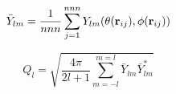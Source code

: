 \documentclass[12pt]{article}
\begin{document}
$$
   \bar{Y}_{lm} = \frac{1}{nnn}\sum_{j = 1}^{nnn} Y_{lm}( \theta( {\bf r}_{ij} ), \phi( {\bf r}_{ij} ) ) 
$$

$$
   Q_l = \sqrt{\frac{4 \pi}{2 l + 1} \sum_{m = -l}^{m = l} \bar{Y}_{lm} \bar{Y}^*_{lm}}
   $$
\end{document}
